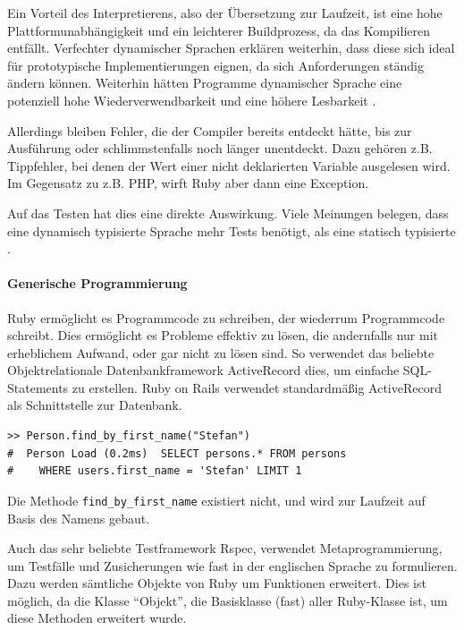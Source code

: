 Ein Vorteil des Interpretierens, also der Übersetzung zur Laufzeit, ist eine hohe Plattformunabhängigkeit und ein leichterer Buildprozess, da das Kompilieren entfällt. 
Verfechter dynamischer Sprachen erklären weiterhin, dass diese sich ideal für prototypische Implementierungen eignen, da sich Anforderungen ständig ändern können. Weiterhin hätten Programme dynamischer Sprache eine potenziell hohe Wiederverwendbarkeit und eine höhere Lesbarkeit \citep{meijer_static_2005} \citep{ousterhout_scripting:_1998}.

Allerdings bleiben Fehler, die der Compiler bereits entdeckt hätte, bis zur Ausführung oder schlimmstenfalls noch länger unentdeckt. Dazu gehören z.B. Tippfehler, bei denen der Wert einer nicht deklarierten Variable ausgelesen wird. Im Gegensatz zu z.B. PHP, wirft Ruby aber dann eine Exception.

Auf das Testen hat dies eine direkte Auswirkung. Viele Meinungen belegen, dass eine dynamisch typisierte Sprache mehr Tests benötigt, als eine statisch typisierte \citep{daniel_spiewak_dynamic_2010}. 



\paragraph{Generische Programmierung}
Ruby ermöglicht es Programmcode zu schreiben, der wiederrum Programmcode schreibt. Dies ermöglicht es Probleme effektiv zu lösen, die andernfalls nur mit erheblichem Aufwand, oder gar nicht zu lösen sind. So verwendet das beliebte Objektrelationale Datenbankframework ActiveRecord dies, um einfache SQL-Statements zu erstellen. Ruby on Rails verwendet standardmäßig ActiveRecord als Schnittstelle zur Datenbank.
\begin{lstlisting}
>> Person.find_by_first_name("Stefan")
#  Person Load (0.2ms)  SELECT persons.* FROM persons
#    WHERE users.first_name = 'Stefan' LIMIT 1
\end{lstlisting}

Die Methode \texttt{find\_by\_first\_name} existiert nicht, und wird zur Laufzeit auf Basis des Namens gebaut.

Auch das sehr beliebte Testframework Rspec, verwendet Metaprogrammierung, um Testfälle und Zusicherungen wie fast in der englischen Sprache zu formulieren. Dazu werden sämtliche Objekte von Ruby um Funktionen erweitert. Dies ist möglich, da die Klasse "`Objekt"', die Basisklasse (fast) aller Ruby-Klasse ist, um diese Methoden erweitert wurde.


